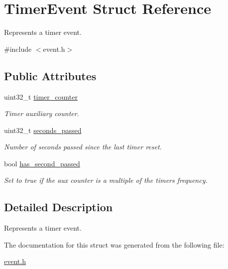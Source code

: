 \hypertarget{struct_timer_event}{}\section{Timer\+Event Struct Reference}
\label{struct_timer_event}


Represents a timer event.  




{\ttfamily \#include $<$event.\+h$>$}

\subsection*{Public Attributes}
\begin{DoxyCompactItemize}
\item 
uint32\+\_\+t \mbox{\hyperlink{group__event_ga9172712556eddc4759318d2b2c527c6a}{timer\+\_\+counter}}
\begin{DoxyCompactList}\small\item\em Timer auxiliary counter. \end{DoxyCompactList}\item 
uint32\+\_\+t \mbox{\hyperlink{group__event_gafb71fa98ff8d281a1007a43b7235bf6e}{seconds\+\_\+passed}}
\begin{DoxyCompactList}\small\item\em Number of seconds passed since the last timer reset. \end{DoxyCompactList}\item 
bool \mbox{\hyperlink{group__event_ga5cc6e66bde06d7bbd60a5205f91969ab}{has\+\_\+second\+\_\+passed}}
\begin{DoxyCompactList}\small\item\em Set to true if the aux counter is a multiple of the timer\textquotesingle{}s frequency. \end{DoxyCompactList}\end{DoxyCompactItemize}


\subsection{Detailed Description}
Represents a timer event. 

The documentation for this struct was generated from the following file\+:\begin{DoxyCompactItemize}
\item 
\mbox{\hyperlink{event_8h}{event.\+h}}\end{DoxyCompactItemize}
